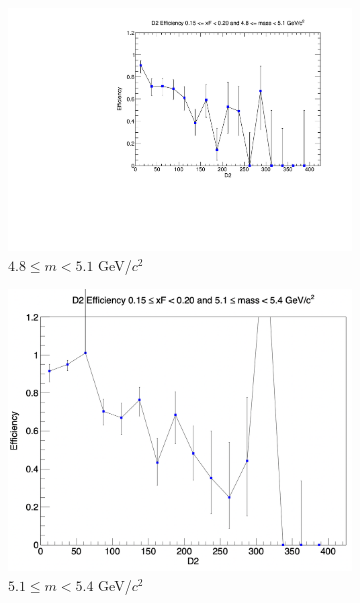 \documentclass[11pt]{article}
\begin{document}
\begin{figure}[p]
\begin{subfigure}[b]{0.32\textwidth}
        \includegraphics[width=\textwidth]{./kTrackerEfficiencyPlots/D2_Efficiency_xF3_mass2.pdf}
        \caption{$4.8 \leq m < 5.1$ GeV/$c^2$}
    \end{subfigure}\vspace{0.5cm}
    \begin{subfigure}[b]{0.32\textwidth}
        \centering
        \includegraphics[width=\textwidth]{./kTrackerEfficiencyPlots/D2_Efficiency_xF3_mass3.png}
        \caption{$5.1 \leq m < 5.4$ GeV/$c^2$}
    \end{subfigure}\hfill
    \begin{subfigure}[b]{0.32\textwidth}
        \centering

\end{subfigure}
\end{figure}
\end{document}
